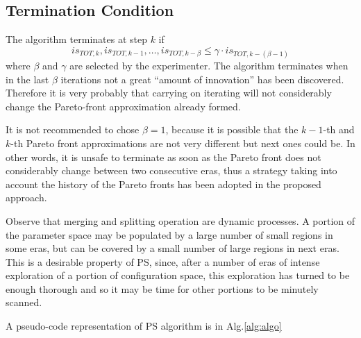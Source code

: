 \subsection{Termination Condition}
The algorithm terminates at step $k$ if
\[
is_{TOT,k},is_{TOT,k-1},\dots,is_{TOT,k-\beta}\le\gamma\cdot is_{TOT,k-\left(\beta-1\right)}
\]
 where $\beta$ and $\gamma$ are selected by the experimenter. 
The algorithm terminates when in the last
$\beta$ iterations not a great ``amount of innovation'' has been
discovered. Therefore it is very probably that carrying on iterating
will not considerably change the Pareto-front approximation already formed. 

It is not recommended to chose $\beta=1$, because it is possible that the
$k-1$-th and $k$-th Pareto front approximations are not very different but next ones could be. In other words,
it is unsafe to terminate as soon as the Pareto front does not considerably change
between two consecutive eras, thus a strategy taking into
account the history of the Pareto fronts has been adopted in the
proposed approach.


Observe that merging and splitting operation are dynamic processes. A portion
of the parameter space may be populated by a large number of small
regions in some eras, but can be covered by a small number of large
regions in next eras. This is a desirable property of PS, since, after a number
of eras of intense exploration of a portion of configuration space, this
exploration has turned to be enough thorough and so it may be time for
other portions to be minutely scanned.

A pseudo-code representation of PS algorithm is in Alg.\ref{alg:algo}

